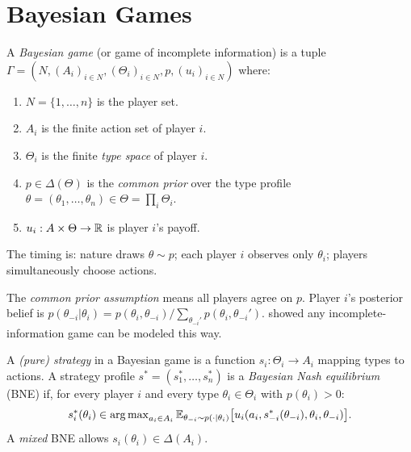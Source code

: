 \documentclass[11pt,a4paper]{article}
\begin{document}
\section{Bayesian Games}
\label{sec:bayesian-games}

\begin{definition}
\label{def:bayesian-game}
A \emph{Bayesian game} (or game of incomplete information) is a tuple
$\Gamma = (N, (A_i)_{i \in N}, (\Theta_i)_{i \in N}, p,
(u_i)_{i \in N})$ where:
\begin{enumerate}[label=(\alph*)]
    \item $N = \{1, \ldots, n\}$ is the player set.
    \item $A_i$ is the finite action set of player $i$.
    \item $\Theta_i$ is the finite \emph{type space} of player $i$.
    \item $p \in \Delta(\Theta)$ is the \emph{common prior} over the type
    profile $\theta = (\theta_1, \ldots, \theta_n) \in
    \Theta = \prod_i \Theta_i$.
    \item $u_i : A \times \Theta \to \mathbb{R}$ is player $i$'s payoff.
\end{enumerate}
The timing is: nature draws $\theta \sim p$; each player $i$ observes
only $\theta_i$; players simultaneously choose actions.
\end{definition}

\begin{remark}
The \emph{common prior assumption} means all players agree on $p$.
Player $i$'s posterior belief is
$p(\theta_{-i}|\theta_i) = p(\theta_i, \theta_{-i})/
\sum_{\theta_{-i}'}p(\theta_i, \theta_{-i}')$.
\citet{harsanyi1967} showed any incomplete-information game can be
modeled this way.
\end{remark}

\begin{definition}
\label{def:bne}
A \emph{(pure) strategy} in a Bayesian game is a function
$s_i : \Theta_i \to A_i$ mapping types to actions. A strategy profile
$s^* = (s_1^*, \ldots, s_n^*)$ is a \emph{Bayesian Nash equilibrium}
(BNE) if, for every player $i$ and every type
$\theta_i \in \Theta_i$ with $p(\theta_i) > 0$:
\[
    s_i^*(\theta_i) \in \operatorname{arg\,max}_{a_i \in A_i}
    \mathbb{E}_{\theta_{-i} \sim p(\cdot|\theta_i)}\bigl[
    u_i(a_i, s_{-i}^*(\theta_{-i}), \theta_i, \theta_{-i})\bigr].
\]
A \emph{mixed} BNE allows $s_i(\theta_i) \in \Delta(A_i)$.
\end{definition}
\end{document}
